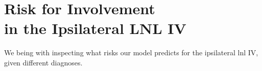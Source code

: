 \documentclass[\relativeRoot/main.tex]{subfiles}
\begin{document}
\section[Risk for Involvement in the Ipsilateral LNL IV]{Risk for Involvement\\in the Ipsilateral LNL IV}
\label{sec:complete:ipsi_IV}

We being with inspecting what risks our model predicts for the ipsilateral \gls{lnl} IV, given different diagnoses.
\end{document}
